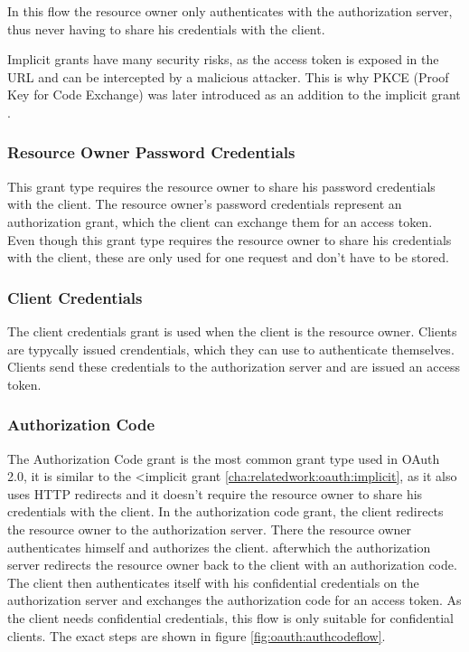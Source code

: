 In this flow the resource owner only authenticates with the authorization server, 
thus never having to share his credentials with the client.

Implicit grants have many security risks, as the access token is exposed in the URL and can be intercepted by a malicious attacker.
This is why PKCE (Proof Key for Code Exchange) was later introduced as an addition to the implicit grant \cite{rfcPkce}.

\subsubsection{Resource Owner Password Credentials}
\label{cha:relatedwork:oauth:passwordcredentials}

This grant type requires the resource owner to share his password credentials with the client.
The resource owner's password credentials represent an authorization grant,
which the client can exchange them for an access token.
Even though this grant type requires the resource owner to share his credentials with the client,
these are only used for one request and don't have to be stored.


\subsubsection{Client Credentials}
\label{cha:relatedwork:oauth:cleintcredentials}

The client credentials grant is used when the client is the resource owner.
Clients are typycally issued crendentials, which they can use to authenticate themselves.
Clients send these credentials to the authorization server and are issued an access token.

\subsubsection{Authorization Code}
\label{cha:relatedwork:oauth:authcode}

The Authorization Code grant is the most common grant type used in OAuth 2.0,
it is similar to the <implicit grant \ref{cha:relatedwork:oauth:implicit}, as it also uses HTTP redirects and it doesn't require the resource owner to share his credentials with the client.
In the authorization code grant, the client redirects the resource owner to the authorization server.
There the resource owner authenticates himself and authorizes the client.
afterwhich the authorization server redirects the resource owner back to the client with an authorization code.
The client then authenticates itself with his confidential credentials on the authorization server and exchanges the authorization code for an access token.
As the client needs confidential credentials, this flow is only suitable for confidential clients.
The exact steps are shown in figure \ref{fig:oauth:authcodeflow}.

